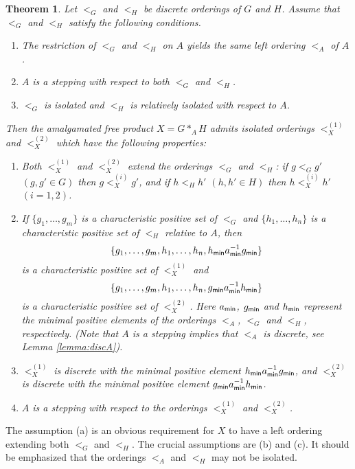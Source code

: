 \documentclass[10pt]{amsart}
\newtheorem{theorem}{Theorem}[section]
\numberwithin{equation}{section}
\begin{document}
\begin{theorem}
\label{theorem:main}
Let $<_{G}$ and $<_{H}$ be discrete orderings of $G$ and $H$. 
Assume that $<_{G}$ and $<_{H}$ satisfy the following conditions.
\begin{enumerate}
\item[(a)] The restriction of $<_{G}$ and $<_{H}$ on $A$ yields the same left ordering $<_{A}$ of $A$.
\item[(b)] $A$ is a stepping with respect to both $<_{G}$ and $<_{H}$.
\item[(c)] $<_{G}$ is isolated and $<_{H}$ is relatively isolated with respect to $A$.
\end{enumerate}
Then the amalgamated free product $X=G *_{A} H$ admits isolated orderings $<_{X}^{(1)}$ and $<_{X}^{(2)}$ which have the following properties:

\begin{enumerate}
\item Both $<_{X}^{(1)}$ and $<_{X}^{(2)}$ extend the orderings $<_{G}$ and $<_{H}$: if $g <_{G} g'$ $(g,g' \in G)$ then $ g <_{X}^{(i)} g'$, and if $h <_{H} h'$ $(h,h' \in H)$ then $ h<_{X}^{(i)} h'$ $(i=1,2)$. 
\item If $\{g_{1},\ldots,g_m\}$ is a characteristic positive set of $<_{G}$ and $\{h_{1},\ldots,h_n\}$ is a characteristic positive set of $<_{H}$ relative to $A$, then 
\[\{g_1,\ldots,g_m, h_1,\ldots,h_n, h_{\sf min}a_{\sf min}^{-1}g_{\sf min}\}\]
 is a characteristic positive set of $<_{X}^{(1)}$ and
\[\{g_1,\ldots,g_m, h_1,\ldots,h_n, g_{\sf min}a_{\sf min}^{-1}h_{\sf min}\} \]
is a characteristic positive set of $<_{X}^{(2)}$.
 Here $a_{\sf min}$, $g_{\sf min}$ and $h_{\sf min}$ represent the minimal positive elements of the orderings $<_{A}$, $<_{G}$ and $<_{H}$, respectively. 
(Note that $A$ is a stepping implies that $<_{A}$ is discrete, see Lemma \ref{lemma:discA}).
\item $<_{X}^{(1)}$ is discrete with the minimal positive element $h_{\sf min}a_{\sf min}^{-1}g_{\sf min}$, and $<_{X}^{(2)}$ is discrete with the minimal positive element $g_{\sf min}a_{\sf min}^{-1}h_{\sf min}$.
\item $A$ is a stepping with respect to the orderings $<_{X}^{(1)}$ and $<_{X}^{(2)}$.
\end{enumerate}

\end{theorem}

The assumption (a) is an obvious requirement for $X$ to have a left ordering  extending both $<_{G}$ and $<_{H}$. The crucial assumptions are (b) and (c). It should be emphasized that the orderings $<_{A}$ and $<_{H}$ may not be isolated. 
\end{document}
